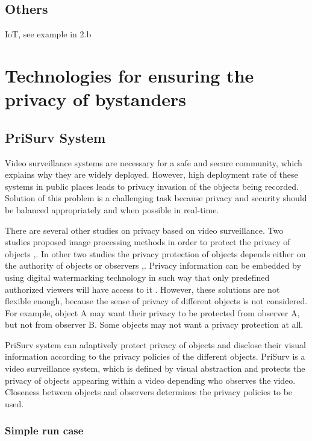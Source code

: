 \documentclass[conference]{IEEEtran}
\begin{document}
\subsection{Others}\label{Others}
IoT, see example in 2.b

\section{Technologies for ensuring the privacy of bystanders}\label{Technologies}

\subsection{PriSurv System}
Video surveillance systems are necessary for a safe and secure community, which explains why they are widely deployed. However, high deployment rate of these systems in public places leads to privacy invasion of the objects being recorded. Solution of this problem is a challenging task because privacy and security should be balanced appropriately and when possible in real-time.

There are several other studies on privacy based on video surveillance. Two studies proposed image processing methods in order to protect the privacy of objects \cite{cavallaro2005},\cite{kitahara2004}. In other two studies the privacy protection of objects depends either on the authority of objects or observers \cite{jehan2005},\cite{senior2005}. Privacy information can be embedded by using digital watermarking technology in such way that only predefined authorized viewers will have access to it \cite{zhang2005}. However, these solutions are not flexible enough, because the sense of privacy of different objects is not considered. For example, object A may want their privacy to be protected from observer A, but not from observer B. Some objects may not want a privacy protection at all. 

PriSurv system \cite{chinomi2008PriSurv} can adaptively protect privacy of objects and disclose their visual information according to the privacy policies of the different objects. PriSurv is a video surveillance system, which is defined by visual abstraction and protects the privacy of objects appearing within a video depending who observes the video. Closeness between objects and observers determines the privacy policies to be used. 


\subsubsection{Simple run case}
\end{document}
